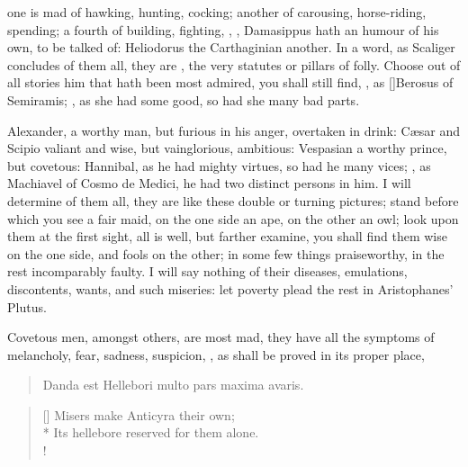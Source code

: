 {one is mad of hawking, hunting, cocking; another of carousing,
horse-riding, spending; a fourth of building, fighting, \etc{}, , Damasippus hath an humour of his
own, to be talked of: Heliodorus the Carthaginian another. In a
word, as Scaliger concludes of them all, they are , the very statutes or pillars of folly. Choose out of all
stories him that hath been most admired, you shall still find, , as [\baselineskip]Berosus of
Semiramis; , as she had some good, so
had she many bad parts.

Alexander, a worthy man, but furious in his anger, overtaken in drink:
C\ae{}sar and Scipio valiant and wise, but vainglorious, ambitious:
Vespasian a worthy prince, but covetous: Hannibal, as he had
mighty virtues, so had he many vices; , as Machiavel of Cosmo de Medici, he had two distinct
persons in him. I will determine of them all, they are like these
double or turning pictures; stand before which you see a fair maid, on
the one side an ape, on the other an owl; look upon them at the first
sight, all is well, but farther examine, you shall find them wise on
the one side, and fools on the other; in some few things praiseworthy,
in the rest incomparably faulty. I will say nothing of their diseases,
emulations, discontents, wants, and such miseries: let poverty plead
the rest in Aristophanes' Plutus.

Covetous men, amongst others, are most mad, they have all the
symptoms of melancholy, fear, sadness, suspicion, \etc{}, as shall be
proved in its proper place,

\begin{verse}
\textlatin{Danda est Hellebori multo pars maxima avaris.}
\end{verse}

\settowidth{\versewidth}{Its hellebore reserved for them alone.}
\begin{verse}[\versewidth]
Misers make Anticyra their own;\\*
Its hellebore reserved for them alone.\\!
\end{verse}

}
